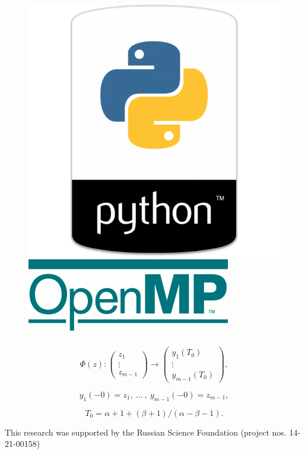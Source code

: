 \documentclass[fullscreen=true, unicode, bookmarks=false]{beamer}
\begin{document}
\begin{frame}
\begin{figure}
\hfill
\includegraphics[scale=0.16]{python.png} 
\vfill 
\includegraphics[scale=0.5]{openmp.png}  
\end{figure}
\end{frame}

\begin{frame}
\frametitle{}
$$
	\Phi(z): \begin{pmatrix}
           z_1 \\
           \vdots \\
           z_{m-1}
          \end{pmatrix}
					\to
					\begin{pmatrix}
           y_1(T_0) \\
           \vdots \\
           y_{m-1}(T_0)
          \end{pmatrix},
$$

$$ y_1(-0) = z_1, \: \dots \: , \: y_{m-1}(-0) = z_{m-1}, $$

$$ T_0 = \alpha + 1 + (\beta+1)/(\alpha - \beta - 1). $$

\vfill

\pause

This research was supported by the Russian Science Foundation (project nos. 14-21-00158)

\end{frame}
\end{document}
